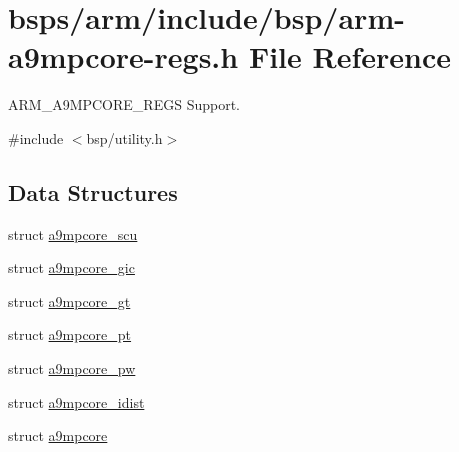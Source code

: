 \hypertarget{arm-a9mpcore-regs_8h}{}\section{bsps/arm/include/bsp/arm-\/a9mpcore-\/regs.h File Reference}
\label{arm-a9mpcore-regs_8h}


A\+R\+M\+\_\+\+A9\+M\+P\+C\+O\+R\+E\+\_\+\+R\+E\+GS Support.  


{\ttfamily \#include $<$bsp/utility.\+h$>$}\newline
\subsection*{Data Structures}
\begin{DoxyCompactItemize}
\item 
struct \mbox{\hyperlink{structa9mpcore__scu}{a9mpcore\+\_\+scu}}
\item 
struct \mbox{\hyperlink{structa9mpcore__gic}{a9mpcore\+\_\+gic}}
\item 
struct \mbox{\hyperlink{structa9mpcore__gt}{a9mpcore\+\_\+gt}}
\item 
struct \mbox{\hyperlink{structa9mpcore__pt}{a9mpcore\+\_\+pt}}
\item 
struct \mbox{\hyperlink{structa9mpcore__pw}{a9mpcore\+\_\+pw}}
\item 
struct \mbox{\hyperlink{structa9mpcore__idist}{a9mpcore\+\_\+idist}}
\item 
struct \mbox{\hyperlink{structa9mpcore}{a9mpcore}}
\end{DoxyCompactItemize}
